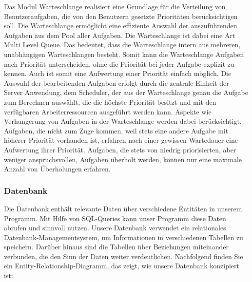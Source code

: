 \documentclass[a4paper,12pt]{article}
\begin{document}
\newline\newline
Das Modul Warteschlange realisiert eine Grundlage für die Verteilung von Benutzeraufgaben, die von den Benutzern gesetzte Prioritäten berücksichtigen soll. Die Warteschlange ermöglicht eine effiziente Auswahl der auszuführenden Aufgaben aus dem Pool aller Aufgaben.
\newline
Die Warteschlange ist dabei eine Art Multi Level Queue. Das bedeutet, dass die Warteschlange intern aus mehreren, unabhängigen Warteschlangen besteht. Somit kann die Warteschlange Aufgaben nach Priorität unterscheiden, ohne die Priorität bei jeder Aufgabe explizit zu kennen. Auch ist somit eine Aufwertung einer Priorität einfach möglich.
\newline
Die Auswahl der bearbeitenden Aufgaben erfolgt durch die zentrale Einheit der Server Anwendung, dem Scheduler, der aus der Warteschlange genau die Aufgabe zum Berechnen auswählt, die die höchste Priorität besitzt und mit den verfügbaren Arbeiterressourcen ausgeführt werden kann. Aspekte wie Verhungerung von Aufgaben in der Warteschlange werden dabei berücksichtigt. Aufgaben, die nicht zum Zuge kommen, weil stets eine andere Aufgabe mit höherer Priorität vorhanden ist, erfahren nach einer gewissen Wartedauer eine Aufwertung ihrer Priorität. Aufgaben, die stets von niedrig priorisierten, aber weniger anspruchsvollen, Aufgaben überholt werden, können nur eine maximale Anzahl von Überholungen erfahren.

\clearpage

\subsubsection{Datenbank}

	Die Datenbank enthält relevante Daten über verschiedene Entitäten in unserem Programm. Mit Hilfe von SQL-Queries kann unser Programm diese Daten abrufen und sinnvoll nutzen.  Unsere Datenbank verwendet ein relationales Datenbank-Managementsystem, um Informationen in verschiedenen Tabellen zu speichern. Darüber hinaus sind die Tabellen über Beziehungen miteinander verbunden, die den Sinn der Daten weiter verdeutlichen. Nachfolgend finden Sie ein Entity-Relationship-Diagramm, das zeigt, wie unsere Datenbank konzipiert ist:
\end{document}
